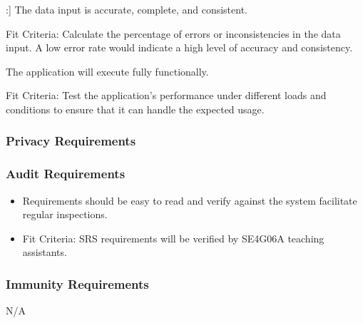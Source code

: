\documentclass[12pt]{article}
\newcounter{reqnum} %
\newcounter{irreqnum} %
\newcounter{prrreqnum} %
\newcounter{aurreqnum} %
\begin{document}
\begin{itemize}
{    \label{R_Inputs}:] The data input is accurate, complete, and consistent.
    \item[] Fit Criteria: Calculate the percentage of errors or inconsistencies in the data input. A low error rate would indicate a high level of accuracy and consistency.
    \item[IR\refstepcounter{irreqnum}\theirreqnum
    \label{R_Inputs}:] The application will execute fully functionally.
    \item[] Fit Criteria: Test the application's performance under different loads and conditions to ensure that it can handle the expected usage.}
\end{itemize}

\subsubsection{Privacy Requirements}

\subsubsection{Audit Requirements}
\begin{itemize}
    \item[AUR\refstepcounter{aurreqnum}\theaurreqnum \label{R_Inputs}:] Requirements should be easy to read and verify against the system facilitate regular inspections.
    \item[] Fit Criteria: SRS requirements will be verified by SE4G06A teaching assistants.
\end{itemize}

\subsubsection{Immunity Requirements}
N/A
\end{document}
